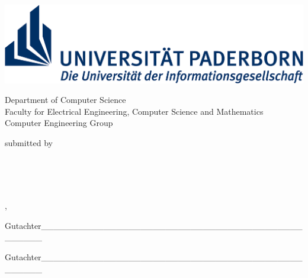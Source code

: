 \begin{titlepage}

\begin{center}   
	
\includegraphics[width=\textwidth]{__pics/uni-logo}	

\medskip

Department of Computer Science\\	Faculty for Electrical Engineering, Computer Science and Mathematics\\Computer Engineering Group

\medskip

\textbf{\myThesisType}

\medskip

submitted by


\medskip

\myName\\ \myAdress\\ \myNumber\\ 

\medskip

\myLocation, \myTime

\bigskip


\bigskip\bigskip\bigskip\bigskip


	\begingroup
		\color{Maroon}\spacedallcaps{\textbf{\myTitle}}
	\endgroup







\vfill

%
%

Gutachter\_\_\_\_\_\_\_\_\_\_\_\_\_\_\_\_\_\_\_\_\_\_\_\_\_\_\_\_\_\_\_\_\_\_\_\_\_\_\_\_\_\_\_\_\_\_\_\_
\raggedleft{\myProf}

\bigskip

Gutachter\_\_\_\_\_\_\_\_\_\_\_\_\_\_\_\_\_\_\_\_\_\_\_\_\_\_\_\_\_\_\_\_\_\_\_\_\_\_\_\_\_\_\_\_\_\_\_\_
\raggedleft{\myOtherProf}


\end{center}  
\end{titlepage}   